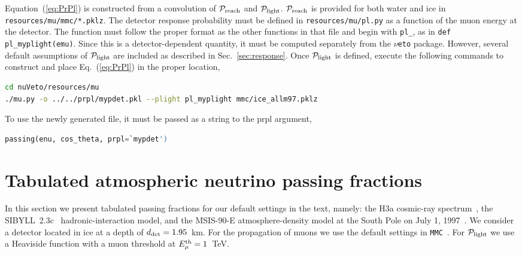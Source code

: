 \documentclass[aps,prd,showpacs,letterpaper,onecolumn,longbibliography,superscriptaddress,notitlepage,nofootinbib]{revtex4-1}%
\newcommand{\Prob}{{\cal P}}
\newcommand{\MMC}{\texttt{MMC}}
\newcommand{\nuveto}{{\LARGE $\nu$}\texttt{eto}}
\begin{document}
Equation~(\ref{eq:PrPl}) is constructed from a convolution of $\Prob_{\rm reach}$ and $\Prob_{\rm light}$. $\Prob_{\rm reach}$ is provided for both water and ice in \lstinline|resources/mu/mmc/*.pklz|. The detector response probability must be defined in \lstinline|resources/mu/pl.py| as a function of the muon energy at the detector. The function must follow the proper format as the other functions in that file and begin with \lstinline|pl_|, as in \lstinline|def pl_myplight(emu)|. Since this is a detector-dependent quantity, it must be computed separately from the \nuveto{} package. However, several default assumptions of $\Prob_{\rm light}$ are included as described in Sec.~\ref{sec:response}. Once $\Prob_{\rm light}$ is defined, execute the following commands to construct and place Eq.~(\ref{eq:PrPl}) in the proper location,
%
\begin{lstlisting}[language=Bash]
cd nuVeto/resources/mu
./mu.py -o ../../prpl/mypdet.pkl --plight pl_myplight mmc/ice_allm97.pklz
\end{lstlisting} 
%
To use the newly generated file, it must be passed as a string to the prpl argument,
%
\begin{lstlisting}[language=Python]
passing(enu, cos_theta, prpl=`mypdet')
\end{lstlisting}\lstinline||
%

\section{Tabulated atmospheric neutrino passing fractions}
\label{app:tables}

In this section we present tabulated passing fractions for our default settings in the text, namely: the H3a cosmic-ray spectrum~\cite{Gaisser:2011cc}, the SIBYLL~2.3c~\cite{Riehn:2017mfm} hadronic-interaction model, and the MSIS-90-E atmosphere-density model at the South Pole on July 1, 1997~\cite{Labitzke:1985, Hedin:1991}. We consider a detector located in ice at a depth of $d_{\rm det} = 1.95$~km. For the propagation of muons we use the default settings in \MMC~\cite{Chirkin:2004hz}. For $\Prob_{\rm light}$ we use a Heaviside function with a muon threshold at $E_\mu^{\rm th} = 1$~TeV.

\newpage 
\end{document}
